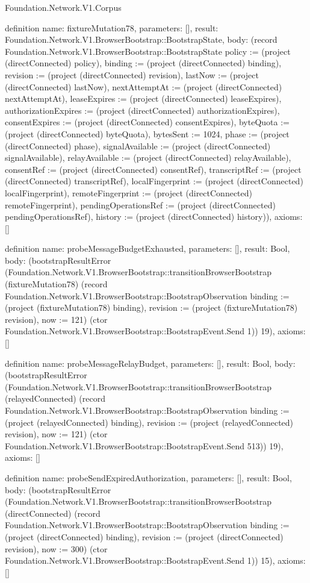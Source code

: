 \begin{lexlean}{Foundation.Network.V1.Corpus}
\begin{semanticmodule}
definition{
  name: fixtureMutation78,
  parameters: [],
  result: Foundation.Network.V1.BrowserBootstrap::BootstrapState,
  body: (record Foundation.Network.V1.BrowserBootstrap::BootstrapState {policy := (project (directConnected) policy), binding := (project (directConnected) binding), revision := (project (directConnected) revision), lastNow := (project (directConnected) lastNow), nextAttemptAt := (project (directConnected) nextAttemptAt), leaseExpires := (project (directConnected) leaseExpires), authorizationExpires := (project (directConnected) authorizationExpires), consentExpires := (project (directConnected) consentExpires), byteQuota := (project (directConnected) byteQuota), bytesSent := 1024, phase := (project (directConnected) phase), signalAvailable := (project (directConnected) signalAvailable), relayAvailable := (project (directConnected) relayAvailable), consentRef := (project (directConnected) consentRef), transcriptRef := (project (directConnected) transcriptRef), localFingerprint := (project (directConnected) localFingerprint), remoteFingerprint := (project (directConnected) remoteFingerprint), pendingOperationsRef := (project (directConnected) pendingOperationsRef), history := (project (directConnected) history)}),
  axioms: []
}

definition{
  name: probeMessageBudgetExhausted,
  parameters: [],
  result: Bool,
  body: (bootstrapResultError (Foundation.Network.V1.BrowserBootstrap::transitionBrowserBootstrap (fixtureMutation78) (record Foundation.Network.V1.BrowserBootstrap::BootstrapObservation {binding := (project (fixtureMutation78) binding), revision := (project (fixtureMutation78) revision), now := 121}) (ctor Foundation.Network.V1.BrowserBootstrap::BootstrapEvent.Send 1)) 19),
  axioms: []
}

definition{
  name: probeMessageRelayBudget,
  parameters: [],
  result: Bool,
  body: (bootstrapResultError (Foundation.Network.V1.BrowserBootstrap::transitionBrowserBootstrap (relayedConnected) (record Foundation.Network.V1.BrowserBootstrap::BootstrapObservation {binding := (project (relayedConnected) binding), revision := (project (relayedConnected) revision), now := 121}) (ctor Foundation.Network.V1.BrowserBootstrap::BootstrapEvent.Send 513)) 19),
  axioms: []
}

definition{
  name: probeSendExpiredAuthorization,
  parameters: [],
  result: Bool,
  body: (bootstrapResultError (Foundation.Network.V1.BrowserBootstrap::transitionBrowserBootstrap (directConnected) (record Foundation.Network.V1.BrowserBootstrap::BootstrapObservation {binding := (project (directConnected) binding), revision := (project (directConnected) revision), now := 300}) (ctor Foundation.Network.V1.BrowserBootstrap::BootstrapEvent.Send 1)) 15),
  axioms: []
}


\end{semanticmodule}
\end{lexlean}
